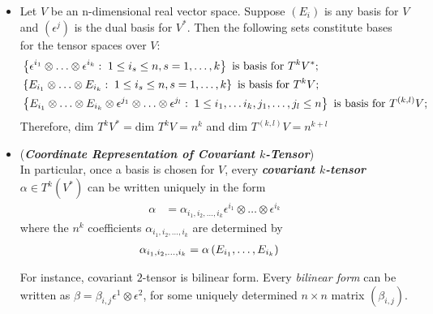 \documentclass[11pt]{article}
\begin{document}
\begin{itemize}
\item \begin{corollary}
Let $V$ be an n-dimensional real vector space. Suppose $(E_i)$ is any basis for $V$ and $(\epsilon^{j})$ is the dual basis for $V^{*}$. Then the following sets constitute
bases for the tensor spaces over $V$:
\begin{align}
&\left\{\epsilon^{i_1} \otimes \ldots \otimes \epsilon^{i_k}: \; 1 \le i_s \le n, s=1,\ldots, k\right\} \text{ is basis for }T^{k}V^{*};  \nonumber\\
&\left\{E_{i_1} \otimes \ldots \otimes E_{i_k}: \; 1 \le i_s \le n, s=1,\ldots, k\right\}   \text{ is basis for }T^{k}V; \nonumber\\
&\left\{E_{i_1} \otimes \ldots \otimes E_{i_k} \otimes \epsilon^{j_1} \otimes \ldots \otimes \epsilon^{j_l}: \; 1 \le i_1, \ldots i_k, j_1,\ldots, j_l \le n\right\} \text{ is basis for }T^{(k, l)}V;  \label{eqn: basis_tensor_space_rank_k}
\end{align}
Therefore, $\text{dim }T^{k}V^{*} = \text{dim }T^{k}V = n^{k}$ and $\text{dim }T^{(k, l)}V = n^{k + l}$
\end{corollary}

\item \begin{remark} (\emph{\textbf{Coordinate Representation of Covariant $k$-Tensor}})\\
In particular, once a basis is chosen for $V$, every \emph{\textbf{covariant $k$-tensor}} $\alpha \in T^{k}(V^{*})$ can be written uniquely in the form
\begin{align}
\alpha &= \alpha_{i_1,i_2,\ldots, i_k} \epsilon^{i_1} \otimes \ldots \otimes \epsilon^{i_k}  \label{eqn: coordinate_represent_covariant_k_tensor}
\end{align}
where the $n^k$ coefficients $\alpha_{i_1,i_2,\ldots, i_k}$ are determined by
\begin{align}
\alpha_{i_1,i_2,\ldots, i_k} &= \alpha\left(E_{i_1} , \ldots , E_{i_k}\right) \label{eqn: coordinate_represent_covariant_k_tensor_coefficient}
\end{align}

For instance, covariant $2$-tensor is bilinear form. Every \emph{bilinear form} can be written as $\beta = \beta_{i,j} \epsilon^1 \otimes \epsilon^2$, for some uniquely determined $n\times n$ matrix $(\beta_{i,j})$.
\end{remark}


\end{itemize}
\end{document}
